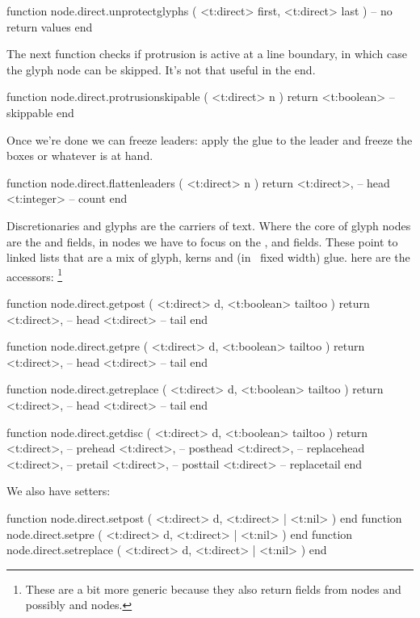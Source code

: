 function node.direct.unprotectglyphs ( <t:direct> first, <t:direct> last )
    -- no return values
end
\stoptyping

The next function checks if protrusion is active at a line boundary, in which case the glyph
node can be skipped. It's not that useful in the end.

\starttyping[option=LUA]
function node.direct.protrusionskipable ( <t:direct> n )
    return <t:boolean> -- skippable
end
\stoptyping

Once we're done we can freeze leaders: apply the glue to the leader and freeze
the boxes or whatever is at hand.

\starttyping[option=LUA]
function node.direct.flattenleaders ( <t:direct> n )
    return
        <t:direct>, -- head
        <t:integer> -- count
end
\stoptyping

\stopsubsection

\startsubsection[title=Discretionaries]

Discretionaries and glyphs are the carriers of text. Where the core of \type
{glyph} nodes are the  and  fields, in  nodes
we have to focus on the ,  and  fields.
These point to linked lists that are a mix of glyph, kerns and (in \LUAMETATEX\
fixed width) glue. here are the accessors: \footnote {These are a bit more
generic because they also return fields from \type {choice} nodes and possibly
\type {hlist} and \type {vlist} nodes.}

\starttyping[option=LUA]
function node.direct.getpost ( <t:direct> d, <t:boolean> tailtoo )
    return
        <t:direct>, -- head
        <t:direct>  -- tail
end

function node.direct.getpre ( <t:direct> d, <t:boolean> tailtoo )
    return
        <t:direct>, -- head
        <t:direct>  -- tail
end

function node.direct.getreplace ( <t:direct> d, <t:boolean> tailtoo )
    return
        <t:direct>, -- head
        <t:direct>  -- tail
end
\stoptyping

\starttyping[option=LUA]
function node.direct.getdisc ( <t:direct> d, <t:boolean> tailtoo )
    return
        <t:direct>, -- prehead
        <t:direct>, -- posthead
        <t:direct>, -- replacehead
        <t:direct>, -- pretail
        <t:direct>, -- posttail
        <t:direct>  -- replacetail
end
\stoptyping

We also have setters:

\starttyping[option=LUA]
function node.direct.setpost    ( <t:direct> d, <t:direct> | <t:nil> ) end
function node.direct.setpre     ( <t:direct> d, <t:direct> | <t:nil> ) end
function node.direct.setreplace ( <t:direct> d, <t:direct> | <t:nil> ) end
\stoptyping


